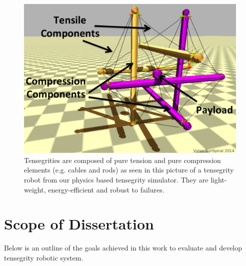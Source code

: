  \begin{figure}[h]
   \centering
   \includegraphics[width=0.5\columnwidth]{tex/img/fig_basic_diagram}
   \caption{{Tensegrities are composed of pure tension and pure compression elements (e.g. cables and rods) as seen in this picture of a tensegrity robot from our physics based tensegrity simulator. They are light-weight, energy-efficient and robust to failures.}}
   \label{fig:basic_diagram1}
\end{figure}

\section{Scope of Dissertation}
\label{goal}
Below is an outline of the goals achieved in this work to evaluate and develop tensegrity robotic system. 

